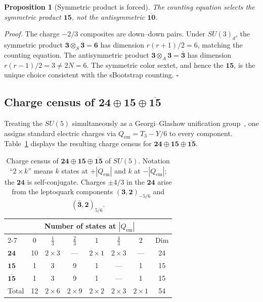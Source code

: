 \documentclass[12pt,a4paper]{article}
\begin{document}
\medskip
\noindent\textbf{Proposition 1} (Symmetric product is forced).
\textit{The counting equation selects the
symmetric product $\mathbf{15}$, not the antisymmetric
$\overline{\mathbf{10}}$.}

\medskip
\noindent\textit{Proof.}
The charge $-2/3$ composites are down--down pairs.
Under $SU(3)_d$, the symmetric product
$\mathbf{3} \otimes_S \mathbf{3} = \mathbf{6}$ has dimension
$r(r+1)/2 = 6$, matching the counting equation.  The antisymmetric
product $\mathbf{3} \otimes_A \mathbf{3} = \bar{\mathbf{3}}$ has
dimension $r(r-1)/2 = 3 \neq 2N = 6$.  The symmetric color sextet,
and hence the $\mathbf{15}$, is the unique choice consistent
with the sBootstrap counting.
\hfill$\square$

\subsection{Charge census of $\mathbf{24} \oplus \mathbf{15}
\oplus \overline{\mathbf{15}}$}
Treating the $SU(5)$ simultaneously as a Georgi--Glashow
unification group~\cite{Rivero2005}, one assigns standard electric
charges via $Q_{\text{em}} = T_3 - Y/6$ to every component.
Table~\ref{tab:census} displays the resulting charge census for
$\mathbf{24} \oplus \mathbf{15} \oplus \overline{\mathbf{15}}$.

\begin{table}[ht]
\centering
\begin{tabular}{lcccccc@{\qquad}c}
\toprule
& \multicolumn{6}{c}{Number of states at $|Q_{\text{em}}|$} & \\
\cmidrule(lr){2-7}
& $0$ & $\tfrac{1}{3}$ & $\tfrac{2}{3}$ & $1$
& $\tfrac{4}{3}$ & $2$ & Dim \\
\midrule
$\mathbf{24}$ & 10 & $2\!\times\!3$ & ---
& $2\!\times\!1$ & $2\!\times\!3$ & --- & 24 \\[2pt]
$\mathbf{15}$ & 1 & 3 & 9
& 1 & --- & 1 & 15 \\[2pt]
$\overline{\mathbf{15}}$ & 1 & 3 & 9
& 1 & --- & 1 & 15 \\[2pt]
\midrule
Total & 12 & $2\!\times\!6$ & $2\!\times\!9$
& $2\!\times\!2$ & $2\!\times\!3$ & $2\!\times\!1$ & 54 \\
\bottomrule
\end{tabular}
\caption{Charge census of
$\mathbf{24} \oplus \mathbf{15} \oplus \overline{\mathbf{15}}$
of $SU(5)$.
Notation ``$2\!\times\!k$'' means $k$ states at $+|Q_{\text{em}}|$ and $k$
at $-|Q_{\text{em}}|$; the $\mathbf{24}$ is self-conjugate.
Charges $\pm 4/3$ in the $\mathbf{24}$ arise from the leptoquark
components $(\mathbf{3},\mathbf{2})_{-5/6}$ and
$(\bar{\mathbf{3}},\mathbf{2})_{5/6}$.}
\label{tab:census}
\end{table}
\end{document}
